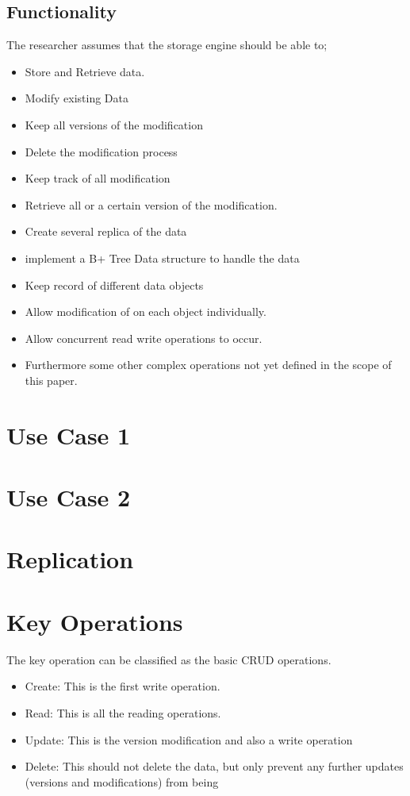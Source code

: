 \documentclass[11pt,a4paper,oneside]{book} %
\numberwithin{equation}{section}
\begin{document}
\subsection{Functionality}
The researcher assumes that the storage engine should be able to;
\begin{itemize}
    \item Store and Retrieve data.
    \item Modify existing Data
    \item Keep all versions of the modification
    \item Delete the modification process
    \item Keep track of all modification
    \item Retrieve all or a certain version of the modification.
    \item Create several replica of the data
    \item implement a B+ Tree Data structure to handle the data
    \item Keep record of different data objects 
    \item Allow modification of on each object individually.
    \item Allow concurrent read write operations to occur. 
    \item Furthermore some other complex operations not yet defined in the scope of this paper. 
\end{itemize}

\section{Use Case 1}

\section{Use Case 2}

\section{Replication}

\section{Key Operations}
The key operation can be classified as the basic CRUD operations. 

\begin{itemize}
    \item Create: This is the first write operation.
    \item Read: This is all the reading operations.
    \item Update: This is the version modification and also a write operation
    \item Delete: This should not delete the data, but only prevent any further updates (versions and modifications) from being 
\end{itemize}
\end{document}

